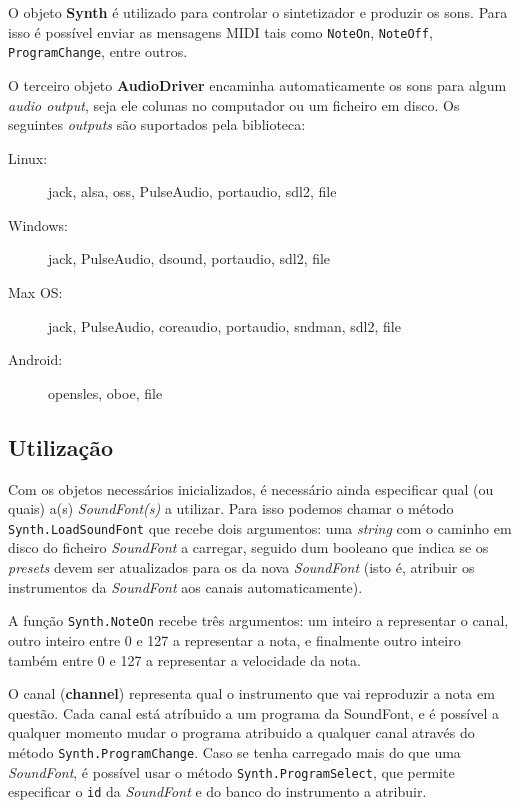 O objeto \textbf{Synth} é utilizado para controlar o sintetizador e produzir os sons. Para isso é possível enviar as mensagens MIDI tais como \texttt{NoteOn}, \texttt{NoteOff}, \texttt{ProgramChange}, entre outros.

O terceiro objeto \textbf{AudioDriver} encaminha automaticamente os sons para algum \textit{audio output}, seja ele colunas no computador ou um ficheiro em disco. Os seguintes \textit{outputs} são suportados pela biblioteca:

\begin{adjustwidth}{20pt}{20pt}
\begin{description}
    \item[Linux:] jack, alsa, oss, PulseAudio, portaudio, sdl2, file
    \item[Windows:] jack, PulseAudio, dsound, portaudio, sdl2, file
    \item[Max OS:] jack, PulseAudio, coreaudio, portaudio, sndman, sdl2, file
    \item[Android:] opensles, oboe, file
\end{description}
\end{adjustwidth}

\subsection{Utilização}
Com os objetos necessários inicializados, é necessário ainda especificar qual (ou quais) a(s) \textit{SoundFont(s)} a utilizar. Para isso podemos chamar o método \texttt{Synth.LoadSoundFont} que recebe dois argumentos: uma \textit{string} com o caminho em disco do ficheiro \textit{SoundFont} a carregar, seguido dum booleano que indica se os \textit{presets} devem ser atualizados para os da nova \textit{SoundFont} (isto é, atribuir os instrumentos da \textit{SoundFont} aos canais automaticamente).

A função \texttt{Synth.NoteOn} recebe três argumentos: um inteiro a representar o canal, outro inteiro entre 0 e 127 a representar a nota, e finalmente outro inteiro também entre 0 e 127 a representar a velocidade da nota.

O canal (\textbf{channel}) representa qual o instrumento que vai reproduzir a nota em questão. Cada canal está atríbuido a um programa da SoundFont, e é possível a qualquer momento mudar o programa atribuido a qualquer canal através do método \texttt{Synth.ProgramChange}. Caso se tenha carregado mais do que uma \textit{SoundFont}, é possível usar o método \texttt{Synth.ProgramSelect}, que permite especificar o \texttt{id} da \textit{SoundFont} e do banco do instrumento a atribuir.

